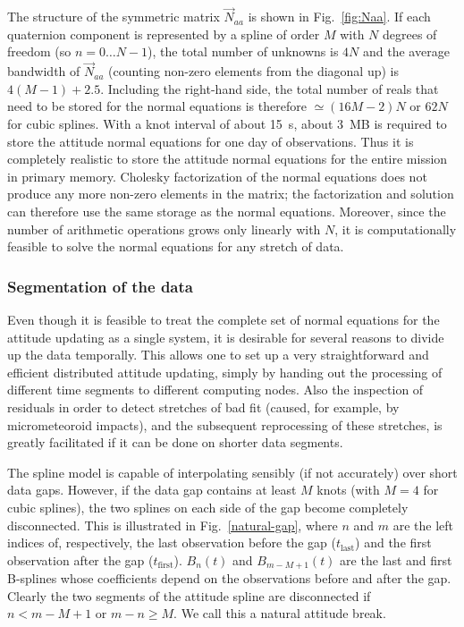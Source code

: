 \documentclass[structabstract]{aa}
\begin{document}
The structure of the symmetric matrix $\vec{N}_{aa}$ is shown in
Fig.~\ref{fig:Naa}. If each quaternion component is represented by a
spline of order $M$ with $N$ degrees of freedom (so $n=0\dots N-1$),
the total number of unknowns is $4N$ and the average bandwidth of
$\vec{N}_{aa}$ (counting non-zero elements from the diagonal up)
is $4(M-1)+2.5$. Including the right-hand side, the total number of
reals that need to be stored for the normal equations is therefore
$\simeq (16M-2)N$ or $62N$ for cubic splines. With a knot interval
of about 15~s, about 3~MB is required to store the attitude normal equations
for one day of observations. Thus it is completely realistic to
store the attitude normal equations for the entire mission in
primary memory. Cholesky factorization of the normal equations
does not produce any more non-zero elements in the matrix; the
factorization and solution can therefore use the same storage
as the normal equations. Moreover, since the number of arithmetic
operations grows only linearly with $N$, it is computationally
feasible to solve the normal equations for any stretch of data.



\subsubsection{Segmentation of the data}\label{sec:att-segment}

Even though it is feasible to treat the complete set of normal
equations for the attitude updating as a single system, it is
desirable for several reasons to divide up the data temporally.
This allows one to set up a very straightforward and efficient distributed
attitude updating, simply by handing out the processing of different
time segments to different computing nodes. Also the inspection of residuals
in order to detect stretches of bad fit (caused, for example, by
micrometeoroid impacts), and the subsequent reprocessing of these
stretches, is greatly facilitated if it can be done on shorter
data segments.

The spline model is capable of interpolating sensibly (if not
accurately) over short data gaps. However, if the data gap contains
at least $M$ knots (with $M=4$ for cubic splines), the two splines
on each side of the gap become completely disconnected. This is
illustrated in Fig.~\ref{natural-gap}, where $n$ and $m$ are the
left indices of, respectively, the last observation before the gap
($t_\text{last}$) and the first observation after the gap
($t_\text{first}$). $B_n(t)$ and $B_{m-M+1}(t)$ are the last and first
B-splines whose coefficients depend on the observations before and
after the gap. Clearly the two segments of the attitude spline are
disconnected if $n<m-M+1$ or $m-n\ge M$. We call this a natural
attitude break.
\end{document}
